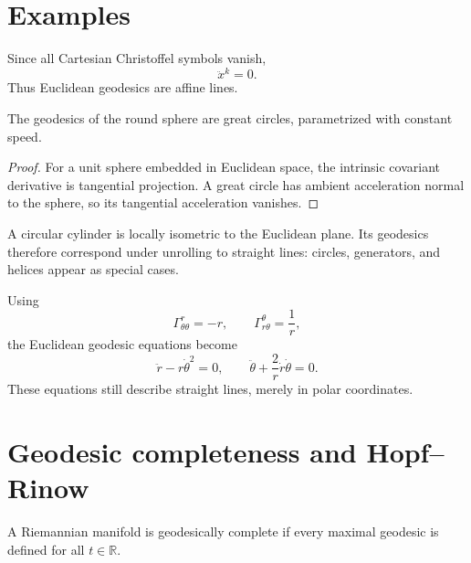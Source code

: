 \section{Examples}

\begin{example}\label{ex:vii23-euclidean}
Since all Cartesian Christoffel symbols vanish,
\[
\ddot x^k=0.
\]
Thus Euclidean geodesics are affine lines.
\end{example}

\begin{example}\label{ex:vii23-sphere}
The geodesics of the round sphere are great circles, parametrized with constant
speed.
\end{example}

\begin{proof}
For a unit sphere embedded in Euclidean space, the intrinsic covariant derivative
is tangential projection.  A great circle has ambient acceleration normal to the
sphere, so its tangential acceleration vanishes.
\end{proof}

\begin{example}[Cylinder]\label{ex:vii23-cylinder}
A circular cylinder is locally isometric to the Euclidean plane.  Its geodesics
therefore correspond under unrolling to straight lines: circles, generators, and
helices appear as special cases.
\end{example}

\begin{example}\label{ex:vii23-polar}
Using
\[
\Gamma^r_{\theta\theta}=-r,
\qquad
\Gamma^\theta_{r\theta}=\frac1r,
\]
the Euclidean geodesic equations become
\[
\ddot r-r\dot\theta^2=0,
\qquad
\ddot\theta+\frac2r\dot r\dot\theta=0.
\]
These equations still describe straight lines, merely in polar coordinates.
\end{example}

\section{Geodesic completeness and Hopf--Rinow}

\begin{definition}\label{def:vii23-complete}
A Riemannian manifold is geodesically complete if every maximal geodesic is
defined for all \(t\in\mathbb R\).
\end{definition}

